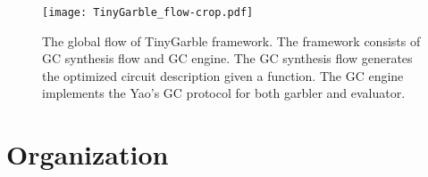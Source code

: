 \begin{figure}[ht]
\centering
\texttt{[image: TinyGarble\_flow-crop.pdf]}
\caption{The global flow of TinyGarble framework.
The framework consists of GC synthesis flow and GC engine.
The GC synthesis flow generates the optimized circuit description given a function.
The GC engine implements the Yao's GC protocol for both garbler and evaluator.
}
\label{fig:globalflow}
\end{figure}

\section{Organization}

